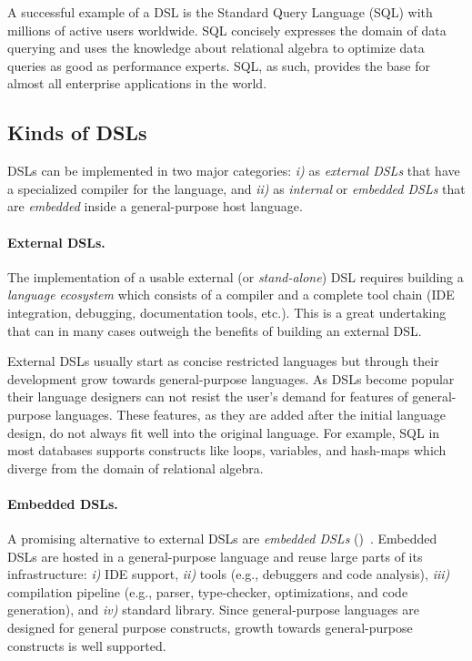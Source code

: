 A successful example of a DSL is the Standard Query Language (SQL) with millions of active
 users worldwide. SQL concisely expresses the domain of data querying and uses
 the knowledge about relational algebra to optimize data queries as good as performance experts.
 SQL, as such, provides the base for almost all enterprise applications in the world.

\subsection{Kinds of DSLs}
\label{sec:kinds-of-dsls}

DSLs can be implemented in two major categories: \emph{i)} as \emph{external DSLs} that
 have a specialized compiler for the language, and \emph{ii)} as \emph{internal} or \emph{embedded DSLs}
 that are \emph{embedded} inside a general-purpose host language.

\paragraph{External DSLs.} The implementation of a usable external (or \emph{stand-alone})
 DSL requires building a \emph{language ecosystem} which consists of a compiler and a complete
 tool chain (IDE integration, debugging, documentation tools, etc.). This is a great undertaking that can in many cases outweigh the
 benefits of building an external DSL.


External DSLs usually start as concise restricted languages but through their development
 grow towards general-purpose languages. As DSLs become popular their language designers
 can not resist the user's demand for features of general-purpose languages.
 These features, as they are added after the initial language design, do not always fit
 well into the original language. For example, SQL in most databases supports constructs
 like loops, variables, and hash-maps which diverge from the domain of relational algebra.

\paragraph{Embedded DSLs.} A promising alternative to external DSLs are
 \emph{embedded DSLs} (\edsls)~\cite{Hudak96csur}. Embedded DSLs are hosted in a
 general-purpose language and reuse large parts of its infrastructure:
 \emph{i)} IDE support, \emph{ii)} tools (e.g., debuggers and code analysis),
 \emph{iii)} compilation pipeline (e.g., parser, type-checker, optimizations, and code generation),
 and \emph{iv)} standard library. Since general-purpose languages are designed for general
 purpose constructs, growth towards general-purpose constructs is well supported.

